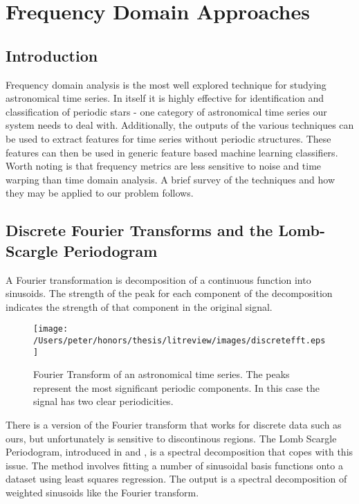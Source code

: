 	\section{Frequency Domain Approaches}
	\subsection{Introduction}
	Frequency domain analysis is the most well explored technique for studying astronomical time series. In itself it is highly effective for identification and classification of periodic stars - one category of astronomical time series our system needs to deal with. Additionally, the outputs of the various techniques can be used to extract features for time series without periodic structures. These features can then be used in generic feature based machine learning classifiers. Worth noting is that frequency metrics are less sensitive to noise and time warping than time domain analysis. A brief survey of the techniques and how they may be applied to our problem follows.
	\subsection{Discrete Fourier Transforms and the Lomb-Scargle Periodogram}
	A Fourier transformation is decomposition of a continuous function into sinusoids. The strength of the peak for each component of the decomposition indicates the strength of that component in the original signal. 
	\begin{figure}[ht!]
	\centering
	\texttt{[image: /Users/peter/honors/thesis/litreview/images/discretefft.eps]}
	\label{fig:fouriertransform}
	\caption{Fourier Transform of an astronomical time series. The peaks represent the most significant periodic components. In this case the signal has two clear periodicities.}
	\end{figure}
	There is a version of the Fourier transform that works for discrete data such as ours, but unfortunately is sensitive to discontinous regions. The Lomb Scargle Periodogram, introduced in \citep{lomb1976least} and \citep{scargle1982studies}, is a spectral decomposition that copes with this issue. The method involves fitting a number of sinusoidal basis functions onto a dataset using least squares regression. The output is a spectral decomposition of weighted sinusoids like the Fourier transform.
	

